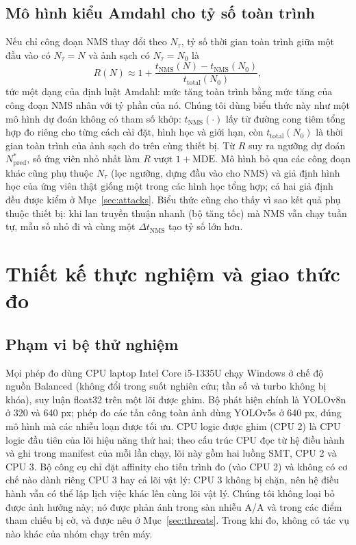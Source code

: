\documentclass[a4paper,fleqn]{cas-dc}
\newcommand{\Ntau}{N_{\tau}}
\begin{document}
\subsection{Mô hình kiểu Amdahl cho tỷ số toàn trình}
\label{sec:amdahl}
Nếu chỉ công đoạn NMS thay đổi theo $\Ntau$, tỷ số thời gian toàn trình giữa một đầu vào có $\Ntau = N$ và ảnh sạch có $\Ntau = N_0$ là
\begin{equation}
R(N) \approx 1 + \frac{t_{\mathrm{NMS}}(N) - t_{\mathrm{NMS}}(N_0)}{t_{\mathrm{total}}(N_0)} ,
\end{equation}
tức một dạng của định luật Amdahl: mức tăng toàn trình bằng mức tăng của công đoạn NMS nhân với tỷ phần của nó. Chúng tôi dùng biểu thức này như một mô hình dự đoán không có tham số khớp: $t_{\mathrm{NMS}}(\cdot)$ lấy từ đường cong tiêm tổng hợp đo riêng cho từng cách cài đặt, hình học và giới hạn, còn $t_{\mathrm{total}}(N_0)$ là thời gian toàn trình của ảnh sạch đo trên cùng thiết bị. Từ $R$ suy ra ngưỡng dự đoán $N^{*}_{\mathrm{pred}}$, số ứng viên nhỏ nhất làm $R$ vượt $1+\mathrm{MDE}$. Mô hình bỏ qua các công đoạn khác cũng phụ thuộc $\Ntau$ (lọc ngưỡng, dựng đầu vào cho NMS) và giả định hình học của ứng viên thật giống một trong các hình học tổng hợp; cả hai giả định đều được kiểm ở Mục~\ref{sec:attacks}. Biểu thức cũng cho thấy vì sao kết quả phụ thuộc thiết bị: khi lan truyền thuận nhanh (bộ tăng tốc) mà NMS vẫn chạy tuần tự, mẫu số nhỏ đi và cùng một $\Delta t_{\mathrm{NMS}}$ tạo tỷ số lớn hơn.

\section{Thiết kế thực nghiệm và giao thức đo}
\label{sec:protocol}
\subsection{Phạm vi bệ thử nghiệm}
Mọi phép đo dùng CPU laptop Intel Core i5-1335U chạy Windows ở chế độ nguồn Balanced (không đổi trong suốt nghiên cứu; tần số và turbo không bị khóa), suy luận float32 trên một lõi được ghim. Bộ phát hiện chính là YOLOv8n ở 320 và 640 px; phép đo các tấn công toàn ảnh dùng YOLOv5s ở 640 px, đúng mô hình mà các nhiễu loạn được tối ưu. CPU logic được ghim (CPU 2) là CPU logic đầu tiên của lõi hiệu năng thứ hai; theo cấu trúc CPU đọc từ hệ điều hành và ghi trong manifest của mỗi lần chạy, lõi này gồm hai luồng SMT, CPU 2 và CPU 3. Bộ công cụ chỉ đặt affinity cho tiến trình đo (vào CPU 2) và không có cơ chế nào dành riêng CPU 3 hay cả lõi vật lý: CPU 3 không bị chặn, nên hệ điều hành vẫn có thể lập lịch việc khác lên cùng lõi vật lý. Chúng tôi không loại bỏ được ảnh hưởng này; nó được phản ánh trong sàn nhiễu A/A và trong các điểm tham chiếu bị cờ, và được nêu ở Mục~\ref{sec:threats}. Trong khi đo, không có tác vụ nào khác của nhóm chạy trên máy.
\end{document}
